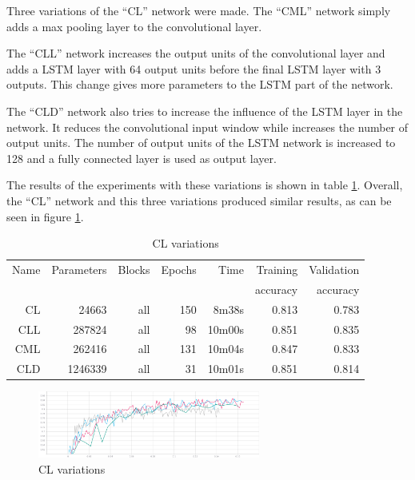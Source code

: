 
Three variations of the ``CL'' network were made.
The ``CML'' network simply adds a max pooling layer to the convolutional layer.

The ``CLL'' network increases the output units of the convolutional layer and adds a LSTM layer with 64 output units before the final LSTM layer with 3 outputs. This change gives more parameters to the LSTM part of the network.

The ``CLD'' network also tries to increase the influence of the LSTM layer in the network. It reduces the convolutional input window while increases the number of output units. The number of output units of the LSTM network is increased to 128 and a fully connected layer is used as output layer.

The results of the experiments with these variations is shown in table \ref{tab:carvingclvariations}.
Overall, the ``CL'' network and this three variations produced similar results, as can be seen in figure \ref{fig:cl-variations}.

\begin{table}[!ht]
    \centering
    \caption{CL variations}
    \label{tab:carvingclvariations}
\begin{tabular}{r|r|r|r|r|r|r}
\hline
Name & Parameters & Blocks & Epochs & Time    & Training          & Validation          \\       
     &            &        &        &         &          accuracy &            accuracy \\ \hline\hline

CL & 24663  & all & 150 & 8m38s  & 0.813 & 0.783 \\ \hline
CLL & 287824  & all & 98  & 10m00s & 0.851 & 0.835 \\ \hline
CML & 262416  & all & 131 & 10m04s & 0.847 & 0.833 \\ \hline
CLD & 1246339 & all & 31  & 10m01s & 0.851 & 0.814 \\ \hline
\end{tabular}
\end{table}

\begin{figure}[htb!]
\centering\includegraphics[width=0.65\textwidth]{content/cl-variations.png}
\caption{\label{fig:cl-variations}CL variations}%
\end{figure}

